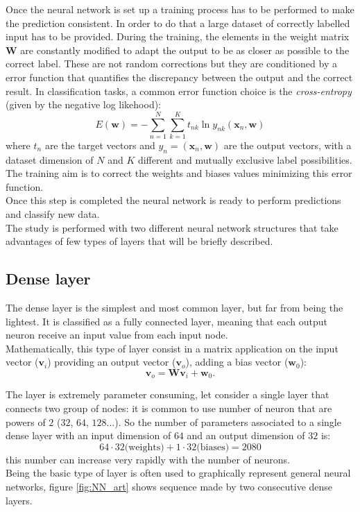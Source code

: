 Once the neural network is set up a training process has to be performed to make the prediction consistent. In order to do that a large dataset of correctly labelled input has to be provided. During the training, the elements in the weight matrix $\bm{W}$ are constantly modified to adapt the output to be as closer as possible to the correct label. These are not random corrections but they are conditioned by a error function that quantifies the discrepancy between the output and the correct result. In classification tasks, a common error function choice is the \textit{cross-entropy} (given by the negative log likehood):
\begin{equation}
    E(\bm{w}) = -\sum_{n=1}^N\sum_{k=1}^K t_{nk}\ln{y_{nk}(\bm{x}_n,\bm{w})}
\end{equation}
where $t_n$ are the target vectors and $y_n=(\bm{x}_n,\bm{w})$ are the output vectors, with a dataset dimension of $N$ and $K$ different and mutually exclusive label possibilities.\\
The training aim is to correct the weights and biases values minimizing this error function.\\
Once this step is completed the neural network is ready to perform predictions and classify new data.\\

The study is performed with two different neural network structures that take advantages of few types of layers that will be briefly described.

\subsection*{Dense layer}
The dense layer is the simplest and most common layer, but far from being the lightest. It is classified as a fully connected layer, meaning that each output neuron receive an input value from each input node.\\
Mathematically, this type of layer consist in a matrix application on the input vector ($\bm{v}_i$) providing an output vector ($\bm{v}_o$), adding a bias vector ($\bm{w}_0$):
\begin{equation}
    \bm{v}_o = \bm{W}\bm{v}_i+\bm{w}_0.
\end{equation}

The layer is extremely parameter consuming, let consider a single layer that connects two group of nodes: it is common to use number of neuron that are powers of $2$ ($32$, $64$, $128$...). So the number of parameters associated to a single dense layer with an input dimension of $64$ and an output dimension of $32$ is:
\begin{equation*}
    64 \cdot 32 \text{(weights)} + 1 \cdot 32 \text{(biases)} = 2080
\end{equation*}
this number can increase very rapidly with the number of neurons.\\
Being the basic type of layer is often used to graphically represent general neural networks, figure \ref{fig:NN_art} shows sequence made by two consecutive dense layers.


